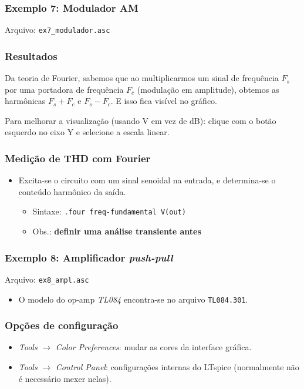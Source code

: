 \documentclass{beamer}
\begin{document}
\begin{frame}
\frametitle{Exemplo 7: Modulador AM}
Arquivo: \texttt{ex7\_modulador.asc}
\end{frame}

\begin{frame}
\frametitle{Resultados}
Da teoria de Fourier, sabemos que ao multiplicarmos um sinal de frequência $F_s$ por uma portadora de frequência $F_c$ (modulação em amplitude), obtemos as harmônicas $F_s + F_c$ e $F_s - F_c$. E isso fica visível no gráfico.

Para melhorar a visualização (usando V em vez de dB): clique com o botão esquerdo no eixo Y e selecione a escala linear.
\end{frame}

\begin{frame}
\frametitle{Medição de THD com Fourier}
\begin{itemize}
\item Excita-se o circuito com um sinal senoidal na entrada, e determina-se o conteúdo harmônico da saída.
\begin{itemize}
\item Sintaxe: \texttt{.four freq-fundamental V(out)}
\item Obs.: \textbf{definir uma análise transiente antes}
\end{itemize}
\end{itemize}
\end{frame}

\begin{frame}
\frametitle{Exemplo 8: Amplificador \textit{push-pull}}
Arquivo: \texttt{ex8\_ampl.asc}
\begin{itemize}
\item O modelo do op-amp \textit{TL084} encontra-se no arquivo \texttt{TL084.301}.
\end{itemize}
\end{frame}

\begin{frame}
\frametitle{Opções de configuração}
\begin{itemize}
\item \textit{Tools} $\rightarrow$ \textit{Color Preferences}: mudar as cores da interface gráfica.
\item \textit{Tools} $\rightarrow$ \textit{Control Panel}: configurações internas do LTspice (normalmente não é necessário mexer nelas).
\end{itemize}
\end{frame}
\end{document}
